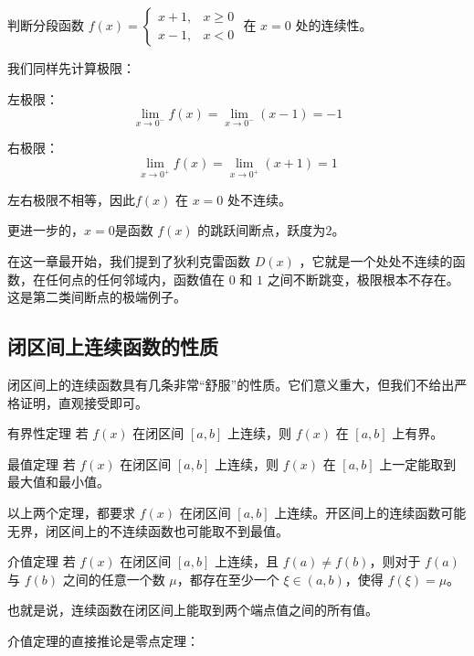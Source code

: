 \begin{myexample}
    判断分段函数 $f(x) = \begin{cases} x+1, & x \geq 0 \\ x-1, & x < 0 \end{cases}$ 在 $x=0$ 处的连续性。

    我们同样先计算极限：

    左极限：
\[
\lim_{x \to 0^-} f(x) = \lim_{x \to 0^-} (x-1) = -1
\]

右极限：
\[
\lim_{x \to 0^+} f(x) = \lim_{x \to 0^+} (x+1) = 1
\]

左右极限不相等，因此$f(x)$ 在 $x=0$ 处不连续。

更进一步的，$x=0$是函数 $f(x)$ 的跳跃间断点，跃度为$2$。
\end{myexample}

在这一章最开始，我们提到了狄利克雷函数 $D(x)$ ，它就是一个处处不连续的函数，在任何点的任何邻域内，函数值在 $0$ 和 $1$ 之间不断跳变，极限根本不存在。这是第二类间断点的极端例子。

\subsection{闭区间上连续函数的性质}

闭区间上的连续函数具有几条非常“舒服”的性质。它们意义重大，但我们不给出严格证明，直观接受即可。

\begin{theorem}{有界性定理}{}
若 $f(x)$ 在闭区间 $[a,b]$ 上连续，则 $f(x)$ 在 $[a,b]$ 上有界。
\end{theorem}

\begin{theorem}{最值定理}{}
若 $f(x)$ 在闭区间 $[a,b]$ 上连续，则 $f(x)$ 在 $[a,b]$ 上一定能取到最大值和最小值。
\end{theorem}

以上两个定理，都要求 $f(x)$ 在闭区间 $[a,b]$ 上连续。开区间上的连续函数可能无界，闭区间上的不连续函数也可能取不到最值。

\begin{theorem}{介值定理}{}
若 $f(x)$ 在闭区间 $[a,b]$ 上连续，且 $f(a) \neq f(b)$，则对于 $f(a)$ 与 $f(b)$ 之间的任意一个数 $\mu$，都存在至少一个 $\xi \in (a,b)$，使得 $f(\xi) = \mu$。

\end{theorem}

也就是说，连续函数在闭区间上能取到两个端点值之间的所有值。

介值定理的直接推论是零点定理：

